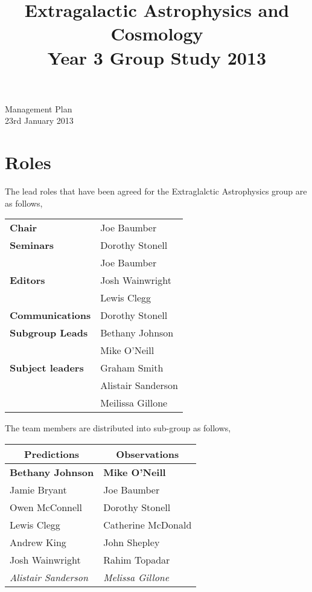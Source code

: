 
\makeatletter
\renewcommand{\@maketitle}{
\newpage
 \null
 \vskip 2em%
 \begin{center}%
  {\Large \@title \par}%
 \end{center}%
 \par} \makeatother

\title{Extragalactic Astrophysics and Cosmology\\
Year 3 Group Study 2013}
\maketitle
\begin{center}
\Huge Management Plan \\[1em]
\large 23rd January 2013
\end{center}

\section{Roles} %
\label{sec:roles}
The lead roles that have been agreed for the  Extraglalctic Astrophysics group are as follows, 

\begin{tabular}{>{\bfseries}ll}
	Chair 			& Joe Baumber \\[0.8em]
	Seminars		& Dorothy Stonell \\
					& Joe Baumber \\[0.8em]
	Editors 		& Josh Wainwright \\
					& Lewis Clegg \\[0.8em]
	Communications 	& Dorothy Stonell \\[0.8em]
	Subgroup Leads	& Bethany Johnson \\
					& Mike O'Neill \\[0.8em]
	Subject leaders	& Graham Smith \\
					& Alistair Sanderson \\
					& Meilissa Gillone
\end{tabular}	

The team members are distributed into sub-group as follows,
\begin{table}[ht]
	\centering
	\begin{tabular}{l|l}
		\multicolumn{1}{c}{\textbf{Predictions}} &   \multicolumn{1}{c}{\textbf{Observations}} \\
		\hline \hline
		\textbf{Bethany Johnson}	& \textbf{Mike O'Neill} \\
		Jamie Bryant	& Joe Baumber \\
		Owen McConnell	& Dorothy Stonell \\
		Lewis Clegg		& Catherine McDonald \\
		Andrew King		& John Shepley\\
		Josh Wainwright	& Rahim Topadar \\
		\textit{Alistair Sanderson} & \textit{Melissa Gillone}
	\end{tabular}
\end{table}

